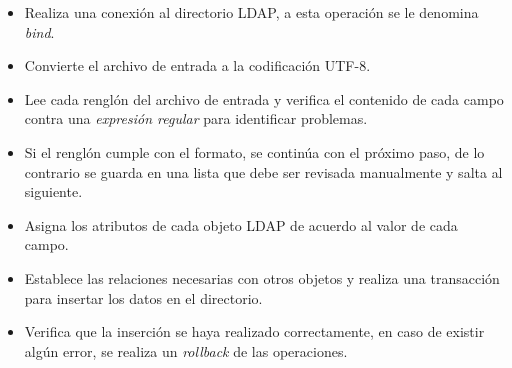 \begin{itemize}
  \item Realiza una conexi\'{o}n al directorio LDAP, a esta operaci\'{o}n se le denomina \textit{bind}.
  \item Convierte el archivo de entrada a la codificaci\'{o}n \textsc{UTF-8}.
  \item Lee cada rengl\'{o}n del archivo de entrada y verifica el contenido de cada campo contra una \textit{expresi\'{o}n regular} para identificar problemas.
  \item Si el rengl\'{o}n cumple con el formato, se contin\'{u}a con el pr\'{o}ximo paso, de lo contrario se guarda en una lista que debe ser revisada manualmente y salta al siguiente.
  \item Asigna los atributos de cada objeto LDAP de acuerdo al valor de cada campo.
  \item Establece las relaciones necesarias con otros objetos y realiza una transacci\'{o}n para insertar los datos en el directorio.
  \item Verifica que la inserci\'{o}n se haya realizado correctamente, en caso de existir alg\'{u}n error, se realiza un \textit{rollback} de las operaciones.
\end{itemize}

